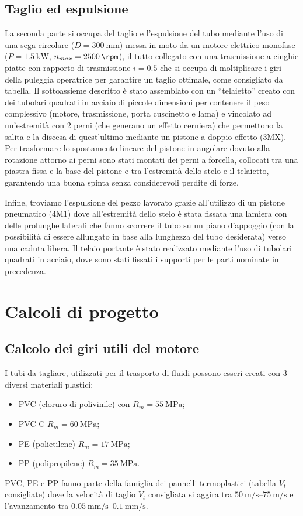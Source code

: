 \documentclass{report}
\begin{document}
\subsection{Taglio ed espulsione}
La seconda parte si occupa del taglio e l’espulsione del tubo mediante l’uso di una sega circolare ($D=\SI{300}{\mm}$) messa in moto da un motore elettrico monofase ($P = \SI{1,5}{\kW}$, $n_{max}=\SI{2500}{\rpm}$), il tutto collegato con una trasmissione a cinghie piatte con rapporto di trasmissione $i=\num{0.5}$ che si occupa di moltiplicare i giri della puleggia operatrice per garantire un taglio ottimale, come consigliato da tabella. Il sottoassieme descritto è stato assemblato con un “telaietto” creato con dei tubolari quadrati in acciaio di piccole dimensioni per contenere il peso complessivo (motore, trasmissione, porta cuscinetto e lama) e vincolato ad un’estremità con 2 perni (che generano un effetto cerniera) che permettono la salita e la discesa di quest’ultimo mediante un pistone a doppio effetto (3MX). Per trasformare lo spostamento lineare del pistone in angolare dovuto alla rotazione attorno ai perni sono stati montati dei perni a forcella, collocati tra una piastra fissa e la base del pistone e tra l’estremità dello stelo e il telaietto, garantendo una buona spinta senza considerevoli perdite di forze. 

Infine, troviamo l’espulsione del pezzo lavorato grazie all’utilizzo di un pistone pneumatico (4M1) dove all’estremità dello stelo è stata fissata una lamiera con delle prolunghe laterali che fanno scorrere il tubo su un piano d’appoggio (con la possibilità di essere allungato in base alla lunghezza del tubo desiderata) verso una caduta libera. Il telaio portante è stato realizzato mediante l’uso di tubolari quadrati in acciaio, dove sono stati fissati i supporti per le parti nominate in precedenza.

\section{Calcoli di progetto}
\subsection{Calcolo dei giri utili del motore}
I tubi da tagliare, utilizzati per il trasporto di fluidi possono esseri creati con 3 diversi materiali plastici:
\begin{itemize}
\item PVC (cloruro di polivinile) con	$R_m = \SI{55}{\MPa}$;
\item PVC-C $R_m = \SI{60}{\MPa}$;
\item PE (polietilene) $R_m = \SI{17}{\MPa}$;
\item PP (polipropilene) $R_m = \SI{35}{\MPa}$.
\end{itemize}
PVC, PE e PP fanno parte della famiglia dei pannelli termoplastici (tabella $V_t$ consigliate) dove la velocità di taglio $V_t$ consigliata si aggira tra $\SIrange{50}{75}{\m\per\s}$ e l’avanzamento tra $\SIrange{0.05}{0.1}{\mm\per\s}$.
\end{document}
